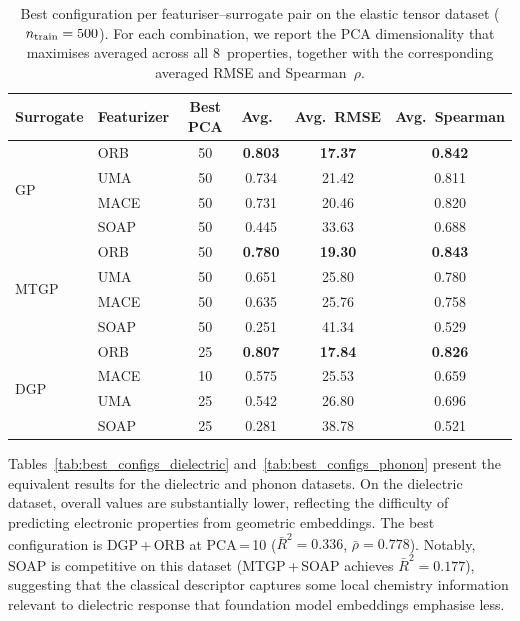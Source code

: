 \begin{table}[!htb]
    \centering
    \caption{Best configuration per featuriser--surrogate pair on the elastic tensor dataset ($n_{\text{train}} = 500$). For each combination, we report the PCA dimensionality that maximises averaged \Rtwo{} across all 8~properties, together with the corresponding averaged RMSE and Spearman~$\rho$.}
    \label{tab:best_configs_elastic}
    \small
    \begin{tabular}{@{}llcccc@{}}
        \toprule
        \textbf{Surrogate} & \textbf{Featurizer} & \textbf{Best PCA} & \textbf{Avg.\ \Rtwo{}} & \textbf{Avg.\ RMSE} & \textbf{Avg.\ Spearman} \\
        \midrule
        \multirow{4}{*}{GP}
        & ORB     & 50 & \textbf{0.803} & \textbf{17.37} & \textbf{0.842} \\
        & UMA     & 50 & 0.734 & 21.42 & 0.811 \\
        & MACE    & 50 & 0.731 & 20.46 & 0.820 \\
        & SOAP    & 50 & 0.445 & 33.63 & 0.688 \\
        \midrule
        \multirow{4}{*}{MTGP}
        & ORB     & 50 & \textbf{0.780} & \textbf{19.30} & \textbf{0.843} \\
        & UMA     & 50 & 0.651 & 25.80 & 0.780 \\
        & MACE    & 50 & 0.635 & 25.76 & 0.758 \\
        & SOAP    & 50 & 0.251 & 41.34 & 0.529 \\
        \midrule
        \multirow{4}{*}{DGP}
        & ORB     & 25 & \textbf{0.807} & \textbf{17.84} & \textbf{0.826} \\
        & MACE    & 10 & 0.575 & 25.53 & 0.659 \\
        & UMA     & 25 & 0.542 & 26.80 & 0.696 \\
        & SOAP    & 25 & 0.281 & 38.78 & 0.521 \\
        \bottomrule
    \end{tabular}
\end{table}

Tables~\ref{tab:best_configs_dielectric} and~\ref{tab:best_configs_phonon} present the equivalent results for the dielectric and phonon datasets.
On the dielectric dataset, overall \Rtwo{} values are substantially lower, reflecting the difficulty of predicting electronic properties from geometric embeddings.
The best configuration is DGP\,+\,ORB at PCA\,=\,10 ($\bar{R}^2 = 0.336$, $\bar{\rho} = 0.778$).
Notably, SOAP is competitive on this dataset (MTGP\,+\,SOAP achieves $\bar{R}^2 = 0.177$), suggesting that the classical descriptor captures some local chemistry information relevant to dielectric response that foundation model embeddings emphasise less.

